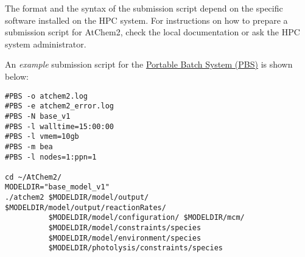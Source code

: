 The format and the syntax of the submission script depend on the
specific software installed on the HPC system. For instructions on how
to prepare a submission script for AtChem2, check the local
documentation or ask the HPC system administrator.

An \emph{example} submission script for the
\href{https://en.wikipedia.org/wiki/Portable_Batch_System}{Portable
  Batch System (PBS)} is shown below:

\begin{verbatim}
#PBS -o atchem2.log
#PBS -e atchem2_error.log
#PBS -N base_v1
#PBS -l walltime=15:00:00
#PBS -l vmem=10gb
#PBS -m bea
#PBS -l nodes=1:ppn=1

cd ~/AtChem2/
MODELDIR="base_model_v1"
./atchem2 $MODELDIR/model/output/ $MODELDIR/model/output/reactionRates/
          $MODELDIR/model/configuration/ $MODELDIR/mcm/
          $MODELDIR/model/constraints/species
          $MODELDIR/model/environment/species
          $MODELDIR/photolysis/constraints/species
\end{verbatim}
